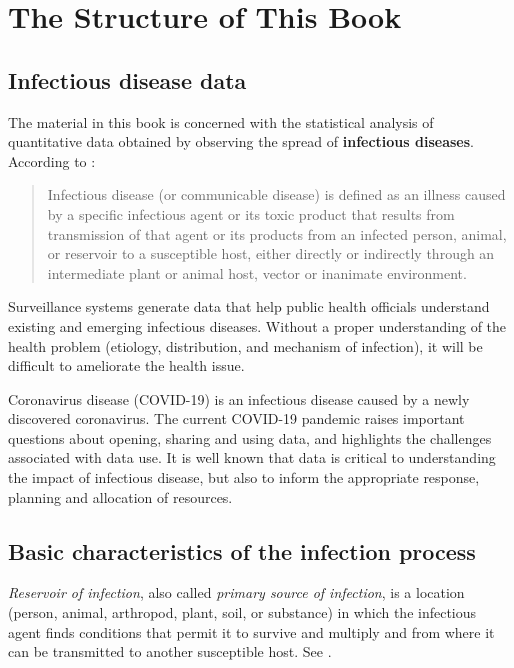 \documentclass[]{book}
\begin{document}
\section{The Structure of This Book}\label{the-structure-of-this-book}

\subsection{Infectious disease data}\label{infectious-disease-data}

The material in this book is concerned with the statistical analysis of
quantitative data obtained by observing the spread of \textbf{infectious
diseases}. According to \citet{porta2014dictionary}:

\begin{quote}
Infectious disease (or communicable disease) is defined as an illness
caused by a specific infectious agent or its toxic product that results
from transmission of that agent or its products from an infected person,
animal, or reservoir to a susceptible host, either directly or
indirectly through an intermediate plant or animal host, vector or
inanimate environment.
\end{quote}

Surveillance systems generate data that help public health officials
understand existing and emerging infectious diseases. Without a proper
understanding of the health problem (etiology, distribution, and
mechanism of infection), it will be difficult to ameliorate the health
issue.

Coronavirus disease (COVID-19) is an infectious disease caused by a
newly discovered coronavirus. The current COVID-19 pandemic raises
important questions about opening, sharing and using data, and
highlights the challenges associated with data use. It is well known
that data is critical to understanding the impact of infectious disease,
but also to inform the appropriate response, planning and allocation of
resources.

\subsection{Basic characteristics of the infection
process}\label{basic-characteristics-of-the-infection-process}

\emph{Reservoir of infection}, also called \emph{primary source of
infection}, is a location (person, animal, arthropod, plant, soil, or
substance) in which the infectious agent finds conditions that permit it
to survive and multiply and from where it can be transmitted to another
susceptible host. See \citet{barreto2006infectious}.
\end{document}
